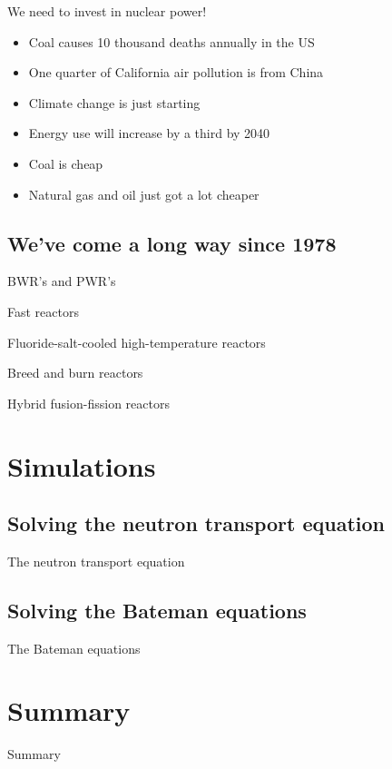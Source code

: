 \documentclass{beamer}
\begin{document}
    \begin{frame}{We need to invest in nuclear power!}

        \begin{itemize}
            \item Coal causes 10 thousand deaths annually in the US
            \pause
            \item One quarter of California air pollution is from China
            \pause
            \item Climate change is just starting
            \pause
            \item Energy use will increase by a third by 2040
            \pause
            \item Coal is cheap
            \pause
            \item Natural gas and oil just got a lot cheaper
        \end{itemize}

    \end{frame}

\subsection{We've come a long way since 1978}

    \begin{frame}{BWR's and PWR's}
    \end{frame}

    \begin{frame}{Fast reactors}
    \end{frame}

    \begin{frame}{Fluoride-salt-cooled high-temperature reactors}
    \end{frame}

    \begin{frame}{Breed and burn reactors}
    \end{frame}

    \begin{frame}{Hybrid fusion-fission reactors}
    \end{frame}

\section{Simulations}

\subsection{Solving the neutron transport equation}

    \begin{frame}{The neutron transport equation}
    \end{frame}

\subsection{Solving the Bateman equations}

    \begin{frame}{The Bateman equations}
    \end{frame}

\section*{Summary}

    \begin{frame}{Summary}
    \end{frame}
\end{document}
